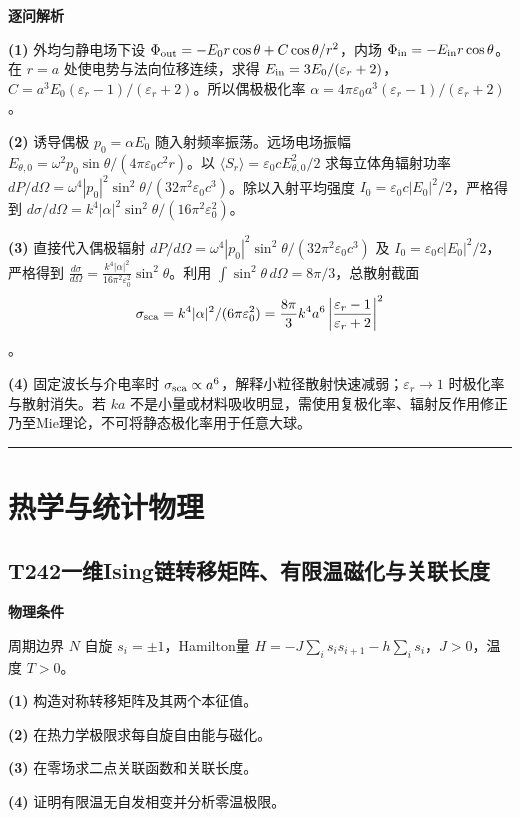 \documentclass[UTF8,a4paper,11pt,oneside,openany]{ctexbook}
\begin{document}
\par\medskip\noindent\textbf{逐问解析}
\par\noindent\textbf{(1)} 外均匀静电场下设 \(\Phi_{\rm out}=-E_0r\cos\theta+C\cos\theta/r^2\)，内场 \(\Phi_{\rm in}=-E_{\rm in}r\cos\theta\)。在 \(r=a\) 处使电势与法向位移连续，求得 \(E_{\rm in}=3E_0/(\varepsilon_r+2)\)，\(C=a^3E_0(\varepsilon_r-1)/(\varepsilon_r+2)\)。所以偶极极化率 \(\alpha=4\pi\varepsilon_0a^3(\varepsilon_r-1)/(\varepsilon_r+2)\)。
\par\noindent\textbf{(2)} 诱导偶极 \(p_0=\alpha E_0\) 随入射频率振荡。远场电场振幅 \(E_{\theta,0}=\omega^2p_0\sin\theta/(4\pi\varepsilon_0c^2r)\)。以 \(\langle S_r\rangle=\varepsilon_0cE_{\theta,0}^2/2\) 求每立体角辐射功率 \(dP/d\Omega=\omega^4|p_0|^2\sin^2\theta/(32\pi^2\varepsilon_0c^3)\)。除以入射平均强度 \(I_0=\varepsilon_0c|E_0|^2/2\)，严格得到 \(d\sigma/d\Omega=k^4|\alpha|^2\sin^2\theta/(16\pi^2\varepsilon_0^2)\)。
\par\noindent\textbf{(3)} 直接代入偶极辐射 \(dP/d\Omega=\omega^4|p_0|^2\sin^2\theta/(32\pi^2\varepsilon_0c^3)\) 及 \(I_0=\varepsilon_0c|E_0|^2/2\)，严格得到 \(\frac{d\sigma}{d\Omega}=\frac{k^4|\alpha|^2}{16\pi^2\varepsilon_0^2}\sin^2\theta\)。利用 \(\int\sin^2\theta\,d\Omega=8\pi/3\)，总散射截面 \[\sigma_{\rm sca}=k^4|\alpha|^2/(6\pi\varepsilon_0^2)=\frac{8\pi}{3}k^4a^6\left|\frac{\varepsilon_r-1}{\varepsilon_r+2}\right|^2\]。
\par\noindent\textbf{(4)} 固定波长与介电率时 \(\sigma_{\rm sca}\propto a^6\)，解释小粒径散射快速减弱；\(\varepsilon_r\to1\) 时极化率与散射消失。若 \(ka\) 不是小量或材料吸收明显，需使用复极化率、辐射反作用修正乃至Mie理论，不可将静态极化率用于任意大球。

\par\bigskip\hrule\bigskip
\chapter{热学与统计物理}
\section*{T242\quad 一维Ising链转移矩阵、有限温磁化与关联长度}
\textbf{物理条件}\par 周期边界 \(N\) 自旋 \(s_i=\pm1\)，Hamilton量 \(H=-J\sum_i s_is_{i+1}-h\sum_i s_i\)，\(J>0\)，温度 \(T>0\)。
\par\noindent\textbf{(1)} 构造对称转移矩阵及其两个本征值。
\par\noindent\textbf{(2)} 在热力学极限求每自旋自由能与磁化。
\par\noindent\textbf{(3)} 在零场求二点关联函数和关联长度。
\par\noindent\textbf{(4)} 证明有限温无自发相变并分析零温极限。
\end{document}
